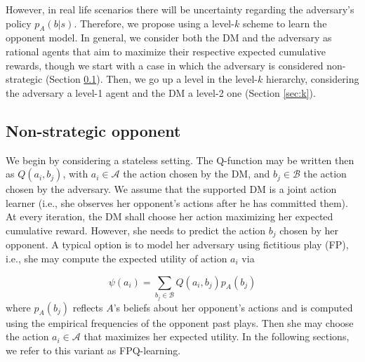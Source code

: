 \documentclass[letterpaper]{article} %
\DeclareMathOperator*{\argmax}{arg\,max}
\newtheorem{proposition}{Proposition}
\begin{document}

However, in real life scenarios there will be uncertainty regarding the adversary's policy $p_A (b | s)$. Therefore, we propose using a level-$k$ scheme \cite{rios2009adversarial}
 to learn the opponent model. 
In general, we consider both the DM and the adversary 
as rational agents that aim to maximize their respective expected cumulative rewards, though we start with a case in which the adversary is considered non-strategic (Section \ref{sec:non}). Then, we go up a level in the level-$k$ hierarchy, considering the adversary a level-1 agent and the DM a level-2 one (Section \ref{sec:k}).


\subsection{Non-strategic opponent}\label{sec:non}


We begin by considering a stateless setting. The Q-function may be written then
as $Q(a_i,b_j)$, with $a_i \in \mathcal{A}$ the action chosen by the DM, and $b_j \in \mathcal{B}$ the action chosen by the adversary. We assume that the supported DM is a joint action learner (i.e., she observes her opponent's actions after he has committed them). At every iteration, the DM shall choose her action maximizing her expected cumulative reward. However, she needs to predict the action $b_j$ chosen by her opponent. A typical option is to model her adversary using fictitious play (FP), i.e., she may compute the expected utility of action $a_i$ via

\[ \psi(a_i) = \sum_{b_j \in \mathcal{B}} Q(a_i, b_j) p_{A}(b_j) \]
where $p_A (b_j)$ reflects $A$'s beliefs about her opponent's actions and is computed using the empirical frequencies of the opponent past plays.
Then she may choose the action $a_i \in \mathcal{A}$ that
maximizes her expected utility. In the following sections, we refer to this variant as FPQ-learning.
\end{document}
